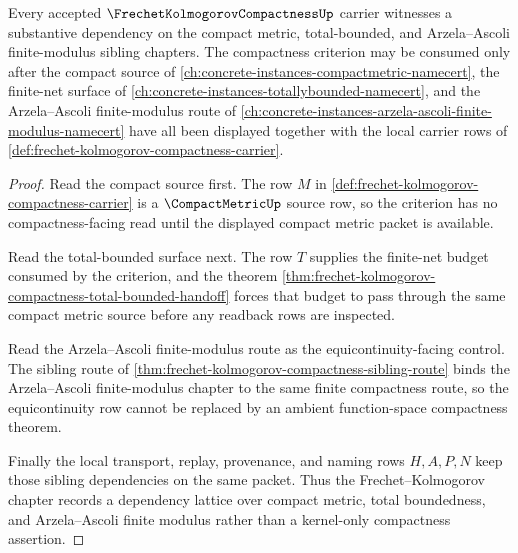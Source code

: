 \begin{theorem}
\label{thm:frechet-kolmogorov-sibling-dependency-witness}
Every accepted $\FrechetKolmogorovCompactnessUp$ carrier witnesses a substantive dependency on the compact metric, total-bounded, and Arzela--Ascoli finite-modulus sibling chapters. The compactness criterion may be consumed only after the compact source of \autoref{ch:concrete-instances-compactmetric-namecert}, the finite-net surface of \autoref{ch:concrete-instances-totallybounded-namecert}, and the Arzela--Ascoli finite-modulus route of \autoref{ch:concrete-instances-arzela-ascoli-finite-modulus-namecert} have all been displayed together with the local carrier rows of \autoref{def:frechet-kolmogorov-compactness-carrier}.
\end{theorem}
\begin{proof}
Read the compact source first. The row $M$ in \autoref{def:frechet-kolmogorov-compactness-carrier} is a $\CompactMetricUp$ source row, so the criterion has no compactness-facing read until the displayed compact metric packet is available.

Read the total-bounded surface next. The row $T$ supplies the finite-net budget consumed by the criterion, and the theorem \autoref{thm:frechet-kolmogorov-compactness-total-bounded-handoff} forces that budget to pass through the same compact metric source before any readback rows are inspected.

Read the Arzela--Ascoli finite-modulus route as the equicontinuity-facing control. The sibling route of \autoref{thm:frechet-kolmogorov-compactness-sibling-route} binds the Arzela--Ascoli finite-modulus chapter to the same finite compactness route, so the equicontinuity row cannot be replaced by an ambient function-space compactness theorem.

Finally the local transport, replay, provenance, and naming rows $H,A,P,N$ keep those sibling dependencies on the same packet. Thus the Frechet--Kolmogorov chapter records a dependency lattice over compact metric, total boundedness, and Arzela--Ascoli finite modulus rather than a kernel-only compactness assertion.
\end{proof}

